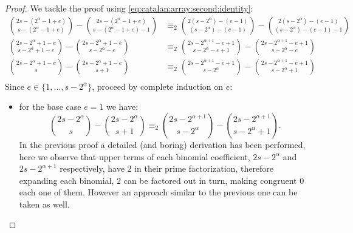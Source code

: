 \begin{proof}
We tackle the proof using \autoref{eq:catalan:array:second:identity}:
\begin{displaymath}
    \begin{split}
        {{2s-(2^{{\alpha}}-1+e)}\choose{s-(2^{{\alpha}}-1+e)}} - {{2s-(2^{{\alpha}}-1+e)}\choose{s-(2^{{\alpha}}-1+e)-1}}
        &\equiv_{2}
        {{2(s-2^{{\alpha}})-(e-1)}\choose{(s-2^{{\alpha}})-(e-1)}} - {{2(s-2^{{\alpha}})-(e-1)}\choose{(s-2^{{\alpha}})-(e-1)-1}}\\
        {{2s-2^{{\alpha}}+1-e}\choose{s-2^{{\alpha}}+1-e}} - {{2s-2^{{\alpha}}+1-e}\choose{s-2^{{\alpha}}-e}}
        &\equiv_{2}
        {{2s-2^{{\alpha}+1}-e+1}\choose{s-2^{{\alpha}}-e+1}} - {{2s-2^{{\alpha}+1}-e+1}\choose{s-2^{{\alpha}}-e}}\\
        {{2s-2^{{\alpha}}+1-e}\choose{s}} - {{2s-2^{{\alpha}}+1-e}\choose{s+1}} &\equiv_{2}
        {{2s-2^{{\alpha}+1}-e+1}\choose{s-2^{{\alpha}}}} - {{2s-2^{{\alpha}+1}-e+1}\choose{s-2^{{\alpha}}+1}}\\
    \end{split}
\end{displaymath}
Since $e\in\lbrace1,\ldots,s-2^{{\alpha}}\rbrace$, proceed by complete induction on $e$:
    \begin{itemize}
        \item for the base case $e=1$ we have:
            \begin{displaymath}
                    {{2s-2^{{\alpha}}}\choose{s}} - {{2s-2^{{\alpha}}}\choose{s+1}} \equiv_{2}
                        {{2s-2^{{\alpha}+1}}\choose{s-2^{{\alpha}}}} - {{2s-2^{{\alpha}+1}}\choose{s-2^{{\alpha}}+1}}.
            \end{displaymath}
            In the previous proof a detailed (and boring) derivation has been performed,
            here we observe that upper terms of each binomial coefficient, $2s-2^{{\alpha}}$
            and $2s-2^{{\alpha}+1}$ respectively, have $2$ in their prime factorization, therefore
            expanding each binomial, $2$ can be factored out in turn, making congruent $0$
            each one of them. However an approach similar to the previous one can be
            taken as well.


\end{itemize}
\end{proof}
